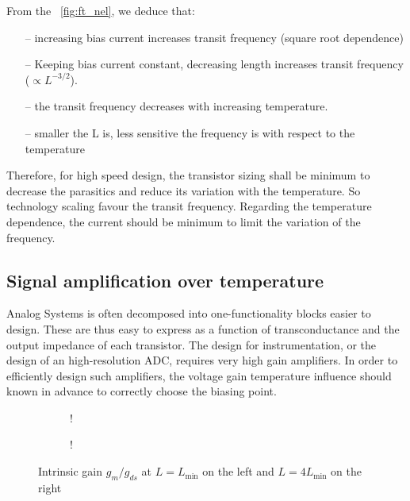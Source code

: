 From the \figurename~\ref{fig:ft_nel}, we deduce that:
\begin{itemize}
\item[--] increasing bias current increases transit frequency (square root dependence)
\item[--] Keeping bias current constant, decreasing length increases transit frequency (\(\propto L^{-3/2}\)).
\item[--] the transit frequency decreases with increasing temperature.
\item[--] smaller the L is, less sensitive the frequency is with respect to the temperature
\end{itemize}
Therefore, for high speed design, the transistor sizing shall be minimum to decrease the parasitics and reduce its variation with the temperature. So technology scaling favour the transit frequency. Regarding the temperature dependence, the current should be minimum to limit the variation of the frequency.

\subsection{Signal amplification over temperature}
\label{sec:des_accuracy}
Analog Systems is often decomposed into one-functionality blocks easier to design. These are thus easy to express as a function of transconductance and the output impedance of each transistor. The design for instrumentation, or the design of an high-resolution ADC, requires very high gain amplifiers. In order to efficiently design such amplifiers, the voltage gain temperature influence should known in advance to correctly choose the biasing point.

\begin{figure}[!ht]
    \centering
    \begin{subfigure}[b]{0.48\textwidth}
        \resizebox {\textwidth} {!} { 
            
        }
    \end{subfigure}
    \begin{subfigure}[b]{0.48\textwidth}
        \resizebox {\textwidth} {!} { 
            
        }
        \label{fig:Av_nel_sensitivity}
    \end{subfigure}
    \caption{Intrinsic gain \(g_m/g_{ds} \) at \(L = L_{\min}\) on the left and \(L = 4 L_{\min}\) on the right}
    \label{fig:Av_nel}
\end{figure}


